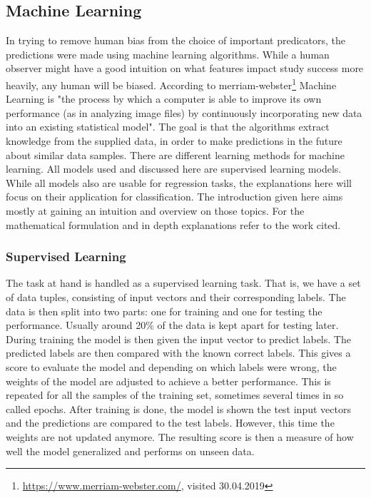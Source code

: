 \subsection{Machine Learning}
In trying to remove human bias from the choice of important predicators, the predictions were made using machine learning algorithms. While a human observer might have a good intuition on what features impact study success more heavily, any human will be biased. According to merriam-webster\footnote{\url{https://www.merriam-webster.com/}, visited 30.04.2019} Machine Learning is "the process by which a computer is able to improve its own performance (as in analyzing image files) by continuously incorporating new data into an existing statistical model". The goal is that the algorithms extract knowledge from the supplied data, in order to make predictions in the future about similar data samples. There are different learning methods for machine learning. All models used and discussed here are supervised learning models.\\
While all models also are usable for regression tasks, the explanations here will focus on their application for classification. The introduction given here aims mostly at gaining an intuition and overview on those topics. For the mathematical formulation and in depth explanations refer to the work cited.

\subsubsection{Supervised Learning}
The task at hand is handled as a supervised learning task. That is, we have a set of data tuples, consisting of input vectors and their corresponding labels. The data is then split into two parts: one for training and one for testing the performance. Usually around 20\% of the data is kept apart for testing later. During training the model is then given the input vector to predict labels. The predicted labels are then compared with the known correct labels. This gives a score to evaluate the model and depending on which labels were wrong, the weights of the model are adjusted to achieve a better performance. This is repeated for all the samples of the training set, sometimes several times in so called epochs. After training is done, the model is shown the test input vectors and the predictions are compared to the test labels. However, this time the weights are not updated anymore. The resulting score is then a measure of how well the model generalized and performs on unseen data.

